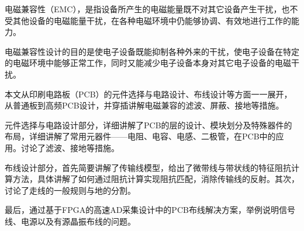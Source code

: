 

\begin{cnabstract}
\xiaosi

电磁兼容性（EMC），是指设备所产生的电磁能量既不对其它设备产生干扰，也不受其他设备的电磁能量干扰，在各种电磁环境中仍能够协调、有效地进行工作的能力。

    电磁兼容性设计的目的是使电子设备既能抑制各种外来的干扰，使电子设备在特定的电磁环境中能够正常工作，同时又能减少电子设备本身对其它电子设备的电磁干扰。

    本文从印刷电路板（PCB）的元件选择与电路设计、布线设计等方面一一展开，从普通板到高频PCB设计，并穿插讲解电磁兼容的滤波、屏蔽、接地等措施。

    元件选择与电路设计部分，详细讲解了PCB的层的设计、模块划分及特殊器件的布局，详细讲解了常用元器件——电阻、电容、电感、二极管，在PCB中的应用。讨论了滤波、接地等措施。

    布线设计部分，首先简要讲解了传输线模型，给出了微带线与带状线的特征阻抗计算方法，具体讲解了如何通过阻抗计算实现阻抗匹配，消除传输线的反射。其次，讨论了走线的一般规则与地的分割。

    最后，通过基于FPGA的高速AD采集设计中的PCB布线解决方案，举例说明信号线、电源以及有源晶振布线的问题。


\end{cnabstract}
\par
\vspace*{2em}	%



